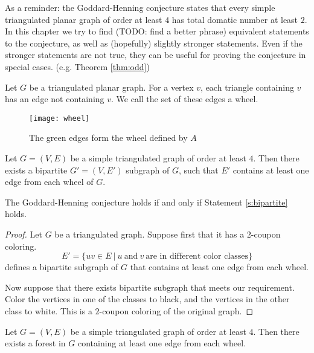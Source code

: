 As a reminder: the Goddard-Henning conjecture states that every simple triangulated
planar graph of order at least $4$ has total domatic number at least $2$. In this
chapter we try to find (TODO: find a better phrase) equivalent statements to the
conjecture, as well as (hopefully) slightly stronger statements. Even if the stronger
statements are not true, they can be useful for proving the conjecture in special cases.
(e.g. Theorem \ref{thm:odd})

\begin{definition}
  Let $G$ be a triangulated planar graph. For a vertex $v$, each triangle
  containing $v$ has an edge not containing $v$. We call the set of these edges a wheel.
\end{definition}

\begin{figure}[ht]
  \centering
  \texttt{[image: wheel]}
  \caption{The green edges form the wheel defined by $A$ }
  \label{fig:wheel}
\end{figure}

\begin{guess}\label{s:bipartite}
  Let $G = (V, E)$ be a simple triangulated graph of order at least $4$. Then there
  exists a bipartite $G' = (V, E')$ subgraph of $G$, such that $E'$ contains at
  least one edge from each wheel of $G$.
\end{guess}

\begin{claim}
  The Goddard-Henning conjecture holds if and only if Statement \ref{s:bipartite} holds.
\end{claim}
\begin{proof}
  Let $G$ be a triangulated graph. Suppose first that it has a $2$-coupon coloring.
  $$E' = \{uv \in E\ |\ u\ \textrm{and}\ v\ \textrm{are in different color classes}\}$$
  defines a bipartite subgraph of $G$ that contains at least one edge from each wheel.

  Now suppose that there exists bipartite subgraph that meets our requirement. Color
  the vertices in one of the classes to black, and the vertices in the other class
  to white. This is a $2$-coupon coloring of the original graph.
\end{proof}

\begin{guess}\label{s:forest}
  Let $G = (V, E)$ be a simple triangulated graph of order at least $4$. Then there
  exists a forest in $G$ containing at least one edge from each wheel.
\end{guess}

